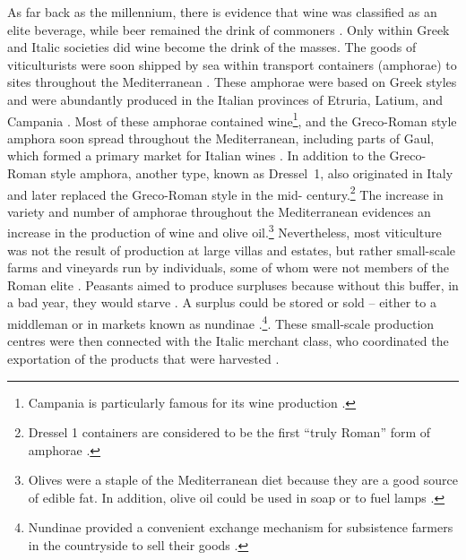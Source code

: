 As far back as the  millennium\BC, there is evidence that wine was classified as an elite beverage, while beer remained the drink of commoners \parencite[233]{Dietler_2006}. 
Only within Greek and Italic societies did wine become the drink of the masses. 
The goods of viticulturists were soon shipped by sea within transport containers (amphorae) to sites throughout the Mediterranean \parencite[9]{Moore_1995}. 
These amphorae were based on Greek styles and were abundantly produced in the Italian provinces of Etruria, Latium, and Campania \parencite[285]{Woolf_1992}. 
Most of these amphorae contained wine\footnote{Campania is particularly famous for its wine production \parencite[6]{Purcell_1985}.}, and the Greco-Roman style amphora soon spread throughout the Mediterranean, including parts of Gaul, which formed a primary market for Italian wines \parencites[141]{Tchernia_2006}[7]{Purcell_1985}[285]{Woolf_1992}. In addition to the Greco-Roman style amphora, another type, known as Dressel~1, also originated in Italy and later replaced the Greco-Roman style in the mid- century\BC \parencites[263]{Peacock_1977}[285]{Woolf_1992}.\footnote{Dressel 1 containers are considered to be the first “truly Roman” form of amphorae \parencite[86]{Toscana_1995}.} 
The increase in variety and number of amphorae throughout the Mediterranean evidences an increase in the production of wine and olive oil.\footnote{Olives were a staple of the Mediterranean diet because they are a good source of edible fat. 
In addition, olive oil could be used in soap or to fuel lamps \parencite[31]{Finley_1999}.} Nevertheless, most viticulture was not the result of production at large villas and estates, but rather small-scale farms and vineyards run by individuals, some of whom were not members of the Roman elite \parencites[163]{Kron_2012}[7]{Purcell_1985}. Peasants aimed to produce surpluses because without this buffer, in a bad year, they would starve \parencite[22]{Bowman_2013}. A surplus could be stored or sold – either to a middleman or in markets known as nundinae \parencite[113]{Storey_2004}.\footnote{Nundinae provided a convenient exchange mechanism for subsistence farmers in the countryside to sell their goods \parencite[113]{Storey_2004}.}.  These small-scale production centres were then connected with the Italic merchant class, who coordinated the exportation of the products that were harvested \parencites[47]{Kehoe_2013}[8]{Purcell_1985}. 

